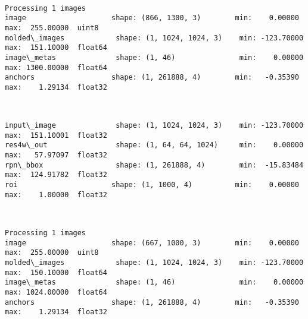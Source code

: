 \documentclass[11pt]{article}
\begin{document}
    \begin{center}
    \end{center}
    { \hspace*{\fill} \\}
    
    \begin{Verbatim}[commandchars=\\\{\}]
Processing 1 images
image                    shape: (866, 1300, 3)        min:    0.00000  max:  255.00000  uint8
molded\_images            shape: (1, 1024, 1024, 3)    min: -123.70000  max:  151.10000  float64
image\_metas              shape: (1, 46)               min:    0.00000  max: 1300.00000  float64
anchors                  shape: (1, 261888, 4)        min:   -0.35390  max:    1.29134  float32

    \end{Verbatim}

    \begin{center}
    \end{center}
    { \hspace*{\fill} \\}
    
    \begin{Verbatim}[commandchars=\\\{\}]
input\_image              shape: (1, 1024, 1024, 3)    min: -123.70000  max:  151.10001  float32
res4w\_out                shape: (1, 64, 64, 1024)     min:    0.00000  max:   57.97097  float32
rpn\_bbox                 shape: (1, 261888, 4)        min:  -15.83484  max:  124.91782  float32
roi                      shape: (1, 1000, 4)          min:    0.00000  max:    1.00000  float32

    \end{Verbatim}

    \begin{center}
    \end{center}
    { \hspace*{\fill} \\}
    
    \begin{Verbatim}[commandchars=\\\{\}]
Processing 1 images
image                    shape: (667, 1000, 3)        min:    0.00000  max:  255.00000  uint8
molded\_images            shape: (1, 1024, 1024, 3)    min: -123.70000  max:  150.10000  float64
image\_metas              shape: (1, 46)               min:    0.00000  max: 1024.00000  float64
anchors                  shape: (1, 261888, 4)        min:   -0.35390  max:    1.29134  float32

    \end{Verbatim}
\end{document}
